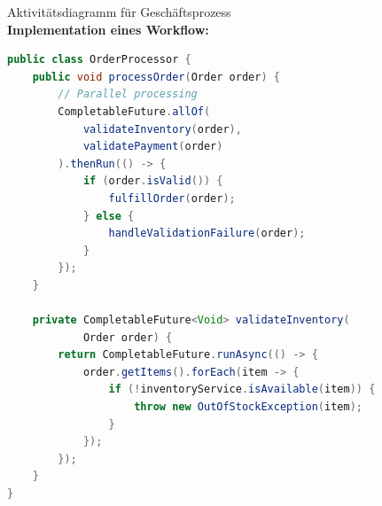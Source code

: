 \begin{example2}{Aktivitätsdiagramm für Geschäftsprozess}\\
\textbf{Implementation eines Workflow:}

\begin{lstlisting}[language=Java, style=basesmol]
public class OrderProcessor {
    public void processOrder(Order order) {
        // Parallel processing
        CompletableFuture.allOf(
            validateInventory(order),
            validatePayment(order)
        ).thenRun(() -> {
            if (order.isValid()) {
                fulfillOrder(order);
            } else {
                handleValidationFailure(order);
            }
        });
    }
    
    private CompletableFuture<Void> validateInventory(
            Order order) {
        return CompletableFuture.runAsync(() -> {
            order.getItems().forEach(item -> {
                if (!inventoryService.isAvailable(item)) {
                    throw new OutOfStockException(item);
                }
            });
        });
    }
}
\end{lstlisting}
\end{example2}